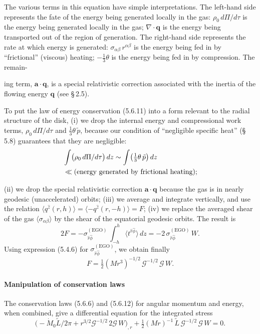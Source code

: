 The various terms in this equation have simple interpretations.  The left-hand side
represents the fate of the energy being generated locally in the gas: $\rho_0\, d\Pi/d\tau$ is
the energy being generated locally in the gas; $\nabla \cdot \mathbf{q}$ is the energy being transported out
of the region of generation.  The right-hand side represents the rate at which
energy is generated: $\sigma_{\alpha\beta}\,r^{\alpha\beta}$ is the energy being fed in by ``frictional''
(viscous) heating; $-\tfrac{1}{3}\theta$ is the energy being fed in by compression.  The remain-

ing term, $\mathbf{a} \cdot \mathbf{q}$, is a special relativistic correction associated with the inertia of
the flowing energy $\mathbf{q}$ (see \S\,2.5).

To put the law of energy conservation (5.6.11) into a form relevant to the
radial structure of the disk, (i) we drop the internal energy and compressional
work terms, $\rho_0\, d\Pi/d\tau$ and $\tfrac{1}{3}\theta\, \tilde{p}$, because our condition of ``negligible specific
heat'' (\S\,5.8) guarantees that they are negligible:
%
\begin{align}
&\int \bigl(\rho_0\, d\Pi/d\tau\bigr)\, dz
  \sim \int \bigl(\tfrac{1}{3}\theta\, \tilde{p}\bigr)\, dz \notag\\
&\ll (\text{energy generated by frictional heating}); \notag
\end{align}

(ii) we drop the special relativistic correction $\mathbf{a}\cdot\mathbf{q}$ because the gas is in nearly
geodesic (unaccelerated) orbits; (iii) we average and integrate vertically, and use
the relation $\langle q^{\hat{z}}(r,h)\rangle = \langle -q^{\hat{z}}(r,-h)\rangle = F$;
(iv) we replace the averaged shear of
the gas $\langle\sigma_{\alpha\beta}\rangle$ by the shear of the equatorial geodesic orbits.  The result is
%
\begin{equation}
2F = -\sigma_{\hat{r}\hat{\phi}}^{(\mathrm{EGO})}\,
  \int_{-h}^{h} \langle t^{\hat{r}\hat{\phi}} \rangle\, dz
  = -2\,\sigma_{\hat{r}\hat{\phi}}^{(\mathrm{EGO})}\, W.
\end{equation}
%
Using expression (5.4.6) for $\sigma_{\hat{r}\hat{\phi}}^{(\mathrm{EGO})}$,
we obtain finally
%
\begin{equation}
\tag{5.6.12}
F = \tfrac{1}{2}(Mr^3)^{-1/2}\,\mathscr{G}^{-1/2}\,\mathscr{G}\,W.
\end{equation}

\paragraph*{Manipulation of conservation laws}
The conservation laws (5.6.6) and (5.6.12) for angular momentum and energy,
when combined, give a differential equation for the integrated stress
%
\begin{equation}
\tag{5.6.13}
\bigl(-\dot{M}_0 \tilde{L}/2\pi
  + r^{3/2}\mathscr{G}^{-1/2}\,2\mathscr{G}\,W\bigr)_{,r}
  + \tfrac{1}{2}(Mr)^{-1}\,\tilde{L}\,\mathscr{G}^{-1/2}\,\mathscr{G}\,W = 0.
\end{equation}

